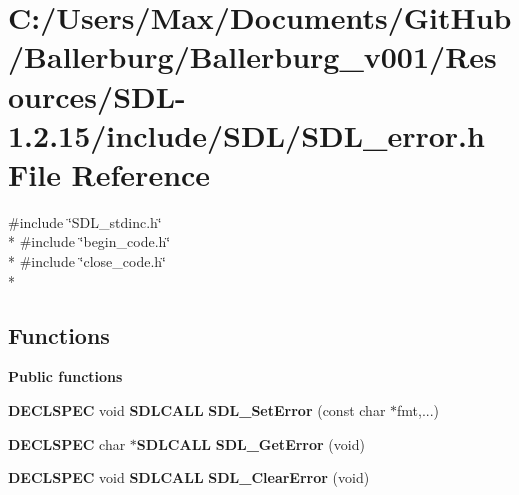 \section{C\+:/\+Users/\+Max/\+Documents/\+Git\+Hub/\+Ballerburg/\+Ballerburg\+\_\+v001/\+Resources/\+S\+D\+L-\/1.2.15/include/\+S\+D\+L/\+S\+D\+L\+\_\+error.h File Reference}
\label{_s_d_l__error_8h}
{\ttfamily \#include \char`\"{}S\+D\+L\+\_\+stdinc.\+h\char`\"{}}\\*
{\ttfamily \#include \char`\"{}begin\+\_\+code.\+h\char`\"{}}\\*
{\ttfamily \#include \char`\"{}close\+\_\+code.\+h\char`\"{}}\\*
\subsection*{Functions}
\begin{Indent}{\bf Public functions}\par
\begin{DoxyCompactItemize}
\item 
{\bf D\+E\+C\+L\+S\+P\+E\+C} void {\bf S\+D\+L\+C\+A\+L\+L} {\bfseries S\+D\+L\+\_\+\+Set\+Error} (const char $\ast$fmt,...)\label{_s_d_l__error_8h_afde07df832effe88d483ab7015fb4c71}

\item 
{\bf D\+E\+C\+L\+S\+P\+E\+C} char $\ast${\bf S\+D\+L\+C\+A\+L\+L} {\bfseries S\+D\+L\+\_\+\+Get\+Error} (void)\label{_s_d_l__error_8h_a5151f59bab897ec9128a5ec6f9cec403}

\item 
{\bf D\+E\+C\+L\+S\+P\+E\+C} void {\bf S\+D\+L\+C\+A\+L\+L} {\bfseries S\+D\+L\+\_\+\+Clear\+Error} (void)\label{_s_d_l__error_8h_a007ed517953a99a46e46be567ef5609e}

\end{DoxyCompactItemize}
\end{Indent}
